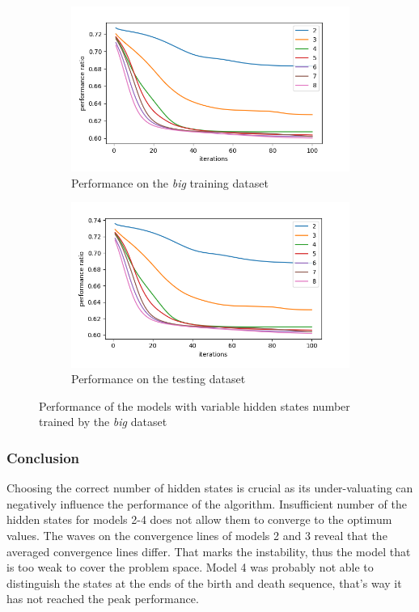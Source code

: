 \documentclass[thesis=M,english]{FITthesis}[2012/10/20]
\begin{document}
\begin{figure}
\centering
\begin{subfigure}{1\textwidth}
  \centering
  \includegraphics[width=1\linewidth]{img/ex5/big_train.png}
  \caption{Performance on the \textit{big} training dataset}
  \label{fig:bgtrain}
\end{subfigure}
\begin{subfigure}{1\textwidth}
  \centering
  \includegraphics[width=1\linewidth]{img/ex5/big_test.png}
  \caption{Performance on the testing dataset}
  \label{fig:bgtest}
\end{subfigure}
\caption{Performance of the models with variable hidden states number trained by the \textit{big} dataset}
\label{fig:bg}
\end{figure}

\subsubsection*{ Conclusion }
Choosing the correct number of hidden states is crucial as its under-valuating can negatively influence the performance of the algorithm. Insufficient number of the hidden states for models 2-4 does not allow them to converge to the optimum values. The waves on the convergence lines of models 2 and 3 reveal that the averaged convergence lines differ. That marks the instability, thus the model that is too weak to cover the problem space. Model 4 was probably not able to distinguish the states at the ends of the birth and death sequence, that's way it has not reached the peak performance.
\end{document}
